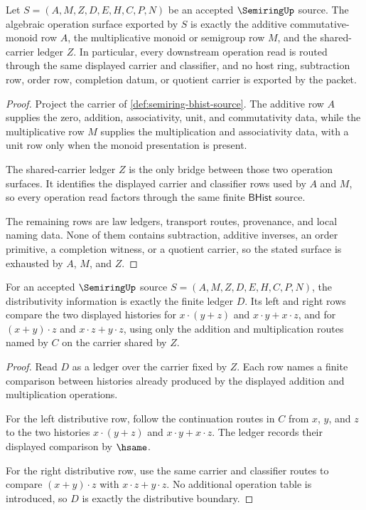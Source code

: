 \begin{theorem}
\label{thm:semiring-additive-multiplicative-obligation-surface}
Let $S=(A,M,Z,D,E,H,C,P,N)$ be an accepted $\SemiringUp$ source. The algebraic
operation surface exported by $S$ is exactly the additive commutative-monoid
row $A$, the multiplicative monoid or semigroup row $M$, and the shared-carrier
ledger $Z$. In particular, every downstream operation read is routed through
the same displayed carrier and classifier, and no host ring, subtraction row,
order row, completion datum, or quotient carrier is exported by the packet.
\end{theorem}
\begin{proof}
Project the carrier of \autoref{def:semiring-bhist-source}. The additive row
$A$ supplies the zero, addition, associativity, unit, and commutativity data,
while the multiplicative row $M$ supplies the multiplication and associativity
data, with a unit row only when the monoid presentation is present.

The shared-carrier ledger $Z$ is the only bridge between those two operation
surfaces. It identifies the displayed carrier and classifier rows used by
$A$ and $M$, so every operation read factors through the same finite
$\mathsf{BHist}$ source.

The remaining rows are law ledgers, transport routes, provenance, and local
naming data. None of them contains subtraction, additive inverses, an order
primitive, a completion witness, or a quotient carrier, so the stated surface
is exhausted by $A$, $M$, and $Z$.
\end{proof}

\begin{theorem}
\label{thm:semiring-distributive-ledger-boundary}
For an accepted $\SemiringUp$ source
$S=(A,M,Z,D,E,H,C,P,N)$, the distributivity information is exactly the finite
ledger $D$. Its left and right rows compare the two displayed histories for
$x\cdot(y+z)$ and $x\cdot y+x\cdot z$, and for $(x+y)\cdot z$ and
$x\cdot z+y\cdot z$, using only the addition and multiplication routes named
by $C$ on the carrier shared by $Z$.
\end{theorem}
\begin{proof}
Read $D$ as a ledger over the carrier fixed by $Z$. Each row names a finite
comparison between histories already produced by the displayed addition and
multiplication operations.

For the left distributive row, follow the continuation routes in $C$ from
$x$, $y$, and $z$ to the two histories $x\cdot(y+z)$ and
$x\cdot y+x\cdot z$. The ledger records their displayed comparison by
$\hsame$.

For the right distributive row, use the same carrier and classifier routes to
compare $(x+y)\cdot z$ with $x\cdot z+y\cdot z$. No additional operation
table is introduced, so $D$ is exactly the distributive boundary.
\end{proof}

